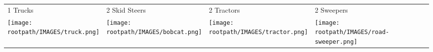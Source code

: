 \begin{tabular}{m{}m{}m{}m{}}
    {\color{ccorange} 1 Trucks} & {\color{ccorange} 2 Skid Steers} & {\color{ccorange} 2 Tractors} & {\color{ccorange} 2 Sweepers} \\
    \texttt{[image: \\rootpath/IMAGES/truck.png]}  & \texttt{[image: \\rootpath/IMAGES/bobcat.png]} & \texttt{[image: \\rootpath/IMAGES/tractor.png]} & \texttt{[image: \\rootpath/IMAGES/road-sweeper.png]}                         
    \end{tabular}